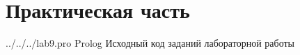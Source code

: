 \chapter*{Практическая часть}

	{../../../lab9.pro} %
	{Prolog} %
	{Исходный код заданий лабораторной работы} %

